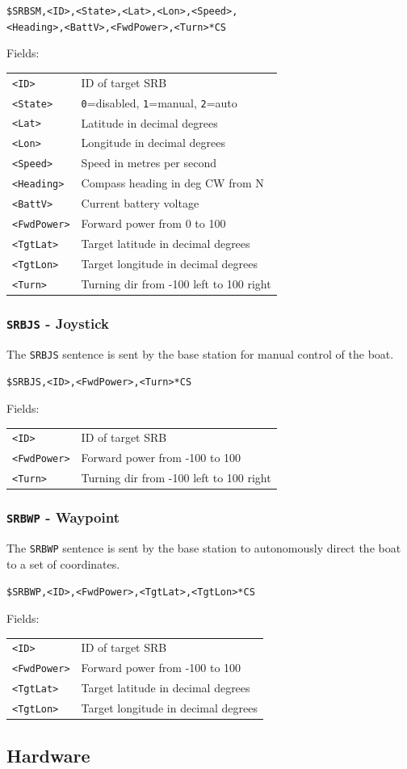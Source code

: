 \documentclass[a4paper]{IEEEtran}
\newenvironment{nmeaspec}[1]
{
\newcommand{\field}[2]{\texttt{##1} & ##2 \\}
\vspace{0.2cm}
\noindent\texttt{#1}
\vspace{0.2cm}

\noindent Fields:
\vspace{0.1cm} \\ 
\noindent \vspace{0.2cm}
\begin{tabular}{ll}
}
{
\end{tabular}
}
\begin{document}
\begin{nmeaspec}{\$SRBSM,<ID>,<State>,<Lat>,<Lon>,<Speed>,\\<Heading>,<BattV>,<FwdPower>,<Turn>*CS}
\field{<ID>}{ID of target SRB}
\field{<State>}{\texttt{0}=disabled, \texttt{1}=manual, \texttt{2}=auto}
\field{<Lat>}{Latitude in decimal degrees}
\field{<Lon>}{Longitude in decimal degrees}
\field{<Speed>}{Speed in metres per second}
\field{<Heading>}{Compass heading in deg CW from N}
\field{<BattV>}{Current battery voltage}
\field{<FwdPower>}{Forward power from 0 to 100}
\field{<TgtLat>}{Target latitude in decimal degrees}
\field{<TgtLon>}{Target longitude in decimal degrees}
\field{<Turn>}{Turning dir from -100 left to 100 right}
\end{nmeaspec}

\subsubsection{\texttt{SRBJS} - Joystick}
The \texttt{SRBJS} sentence is sent by the base station for manual control of the boat.

\begin{nmeaspec}{\$SRBJS,<ID>,<FwdPower>,<Turn>*CS}
\field{<ID>}{ID of target SRB}
\field{<FwdPower>}{Forward power from -100 to 100}
\field{<Turn>}{Turning dir from -100 left to 100 right}
\end{nmeaspec}

\subsubsection{\texttt{SRBWP} - Waypoint}
The \texttt{SRBWP} sentence is sent by the base station to autonomously direct the boat to a set of coordinates.

\begin{nmeaspec}{\$SRBWP,<ID>,<FwdPower>,<TgtLat>,<TgtLon>*CS}
\field{<ID>}{ID of target SRB}
\field{<FwdPower>}{Forward power from -100 to 100}
\field{<TgtLat>}{Target latitude in decimal degrees}
\field{<TgtLon>}{Target longitude in decimal degrees}
\end{nmeaspec}

\subsection{Hardware}
\end{document}
